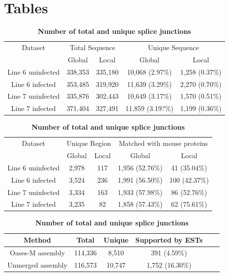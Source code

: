 \documentclass[10pt]{article}
\begin{document}
\section*{Tables}
\begin{table}[!ht]
\caption{
\bf{Unique sequences from global and local assembly}}
\begin{tabular}{ccccc}
\hline
Dataset & \multicolumn{2}{c}{Total Sequence} & \multicolumn{2}{c}{Unique Sequence}\\
 & Global & Local & Global & Local\\
\hline
Line 6 uninfected & 338,353 & 335,180 & 10,068 (2.97\%) & 1,258 (0.37\%)\\
Line 6 infected & 353,485 & 319,920 & 11,639 (3.29\%)& 2,270 (0.70\%)\\
Line 7 uninfected & 335,876 & 302,443 & 10,649 (3.17\%) & 1,570 (0.51\%)\\
Line 7 infected & 371,404 & 327,491 & 11,859 (3.19?\%)& 1,199 (0.36\%)\\
\hline
\end{tabular}
\label{unique_sequences}

\caption{
\bf{Unique regions from global and local assembly}}
\begin{tabular}{ccccc}
\hline
Dataset & \multicolumn{2}{c}{Unique Region} & \multicolumn{2}{c}{Matched with mouse proteins}\\
 & Global & Local & Global & Local\\
\hline
Line 6 uninfected & 2,978 & 117 & 1,956 (52.76\%) & 41 (35.04\%)\\
Line 6 infected & 3,524 & 236 & 1,991 (56.50\%)& 100 (42.37\%)\\
Line 7 uninfected & 3,334 & 163 & 1,933 (57.98\%) & 86 (52.76\%)\\
Line 7 infected & 3,235 & 82 & 1,858 (57.43\%)& 62 (75.61\%)\\
\hline
\end{tabular}
\label{unique_sequences_matched_mouse}

\caption{
\bf{Number of total and unique splice junctions}}
\begin{tabular}{cccccc}
\hline
Method& Total & Unique & Supported by ESTs \\ 
\hline
Oases-M assembly & 114,336 & 8,510 & 391 (4.59\%) \\
Unmerged assembly & 116,573 & 10,747 & 1,752 (16.30\%) \\
\hline
\end{tabular}
\label{Oases-M}


\end{table}
\end{document}
